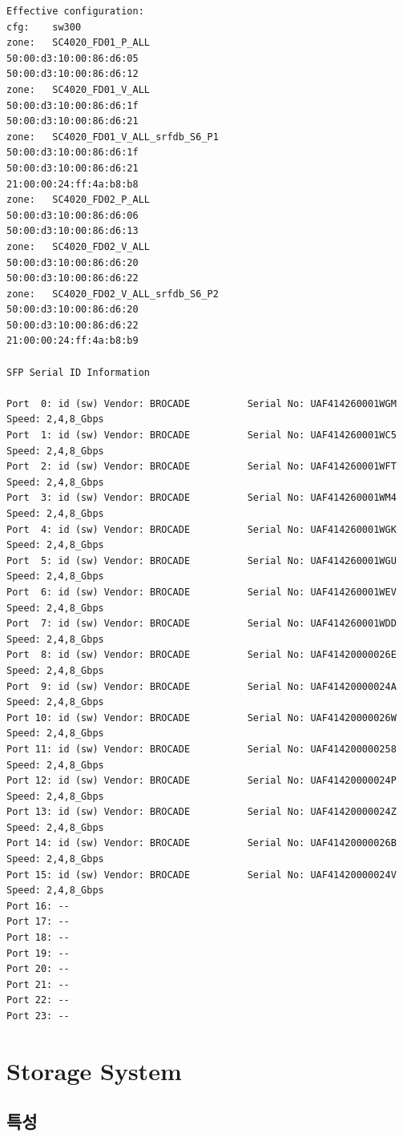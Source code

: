 \documentclass[11pt
  , a4paper
  , article
  , oneside
]{memoir}
\begin{document}
\begin{lstlisting}[style=termstyle]
Effective configuration:
cfg:	sw300	
zone:	SC4020_FD01_P_ALL	
50:00:d3:10:00:86:d6:05
50:00:d3:10:00:86:d6:12
zone:	SC4020_FD01_V_ALL	
50:00:d3:10:00:86:d6:1f
50:00:d3:10:00:86:d6:21
zone:	SC4020_FD01_V_ALL_srfdb_S6_P1	
50:00:d3:10:00:86:d6:1f
50:00:d3:10:00:86:d6:21
21:00:00:24:ff:4a:b8:b8
zone:	SC4020_FD02_P_ALL	
50:00:d3:10:00:86:d6:06
50:00:d3:10:00:86:d6:13
zone:	SC4020_FD02_V_ALL	
50:00:d3:10:00:86:d6:20
50:00:d3:10:00:86:d6:22
zone:	SC4020_FD02_V_ALL_srfdb_S6_P2	
50:00:d3:10:00:86:d6:20
50:00:d3:10:00:86:d6:22
21:00:00:24:ff:4a:b8:b9

SFP Serial ID Information

Port  0: id (sw) Vendor: BROCADE          Serial No: UAF414260001WGM  Speed: 2,4,8_Gbps 
Port  1: id (sw) Vendor: BROCADE          Serial No: UAF414260001WC5  Speed: 2,4,8_Gbps 
Port  2: id (sw) Vendor: BROCADE          Serial No: UAF414260001WFT  Speed: 2,4,8_Gbps 
Port  3: id (sw) Vendor: BROCADE          Serial No: UAF414260001WM4  Speed: 2,4,8_Gbps 
Port  4: id (sw) Vendor: BROCADE          Serial No: UAF414260001WGK  Speed: 2,4,8_Gbps 
Port  5: id (sw) Vendor: BROCADE          Serial No: UAF414260001WGU  Speed: 2,4,8_Gbps 
Port  6: id (sw) Vendor: BROCADE          Serial No: UAF414260001WEV  Speed: 2,4,8_Gbps 
Port  7: id (sw) Vendor: BROCADE          Serial No: UAF414260001WDD  Speed: 2,4,8_Gbps 
Port  8: id (sw) Vendor: BROCADE          Serial No: UAF41420000026E  Speed: 2,4,8_Gbps 
Port  9: id (sw) Vendor: BROCADE          Serial No: UAF41420000024A  Speed: 2,4,8_Gbps 
Port 10: id (sw) Vendor: BROCADE          Serial No: UAF41420000026W  Speed: 2,4,8_Gbps 
Port 11: id (sw) Vendor: BROCADE          Serial No: UAF414200000258  Speed: 2,4,8_Gbps 
Port 12: id (sw) Vendor: BROCADE          Serial No: UAF41420000024P  Speed: 2,4,8_Gbps 
Port 13: id (sw) Vendor: BROCADE          Serial No: UAF41420000024Z  Speed: 2,4,8_Gbps 
Port 14: id (sw) Vendor: BROCADE          Serial No: UAF41420000026B  Speed: 2,4,8_Gbps 
Port 15: id (sw) Vendor: BROCADE          Serial No: UAF41420000024V  Speed: 2,4,8_Gbps 
Port 16: -- 
Port 17: -- 
Port 18: -- 
Port 19: -- 
Port 20: -- 
Port 21: -- 
Port 22: -- 
Port 23: -- 
\end{lstlisting}

\clearpage

\chapter{Storage System}

\section{특성}
\end{document}

